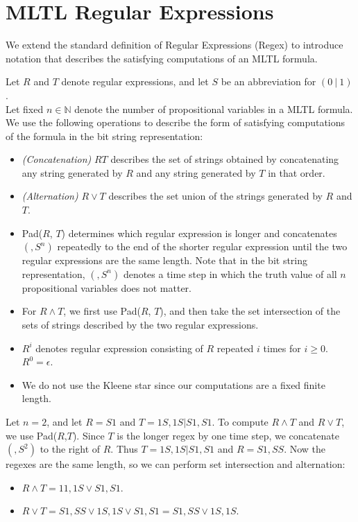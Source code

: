 \documentclass[runningheads]{llncs}
\begin{document}
\section{MLTL Regular Expressions} \label{regex}
\vspace{-0.1in}
We extend the standard definition of Regular Expressions (Regex) \cite{sipser} to introduce notation that describes the satisfying computations of an MLTL formula.
\begin{definition} \label{TRE} 
Let $R$ and $T$ denote regular expressions, and let $S$ be an abbreviation for $(0 \ | \ 1)$.\\
Let fixed $n \in \mathbb{N}$ denote the number of propositional variables in a MLTL formula. We use the following operations to describe the form of satisfying computations of the formula in the bit string representation:
\begin{itemize}
  \item \emph{(Concatenation)} $RT$ describes the set of strings obtained by concatenating any string generated by $R$ and any string generated by $T$ in that order.
 \item \emph{(Alternation)} $R \lor T$ describes the set union of the strings generated by $R$ and $T$.
\item Pad($R$, $T$) determines which regular expression is longer and concatenates $(,S^n)$ repeatedly to the end of the shorter regular expression until the two regular expressions are the same length. Note that in the bit string representation, $(,S^n)$ denotes a time step in which the truth value of all $n$ propositional variables does not matter.
\item For $R \land T$, we first use Pad($R$, $T$), and then take the set intersection of the sets of strings described by the two regular expressions.
\item $R^i$ denotes regular expression consisting of $R$ repeated $i$ times for $i \geq 0$. $R^0 = \epsilon$. %
\item We do not use the Kleene star since our computations are a fixed finite length.
\end{itemize}
\end{definition}
\begin{example} %
Let $n = 2$, and let $R = S1$ and $T = 1S,1S | S1,S1$.
To compute $R \land T$ and $R \lor T$, we use Pad($R$,$T$). Since $T$ is the longer regex by one time step, we concatenate $(,S^2)$ to the right of $R$. Thus $T =1S,1S | S1,S1$ and $R = S1,SS$. Now the regexes are the same length, so we can perform set intersection and alternation:
\begin{itemize}
    \item $R \land T = 11,1S \lor S1, S1$.
    \item $R \lor T = S1,SS \lor 1S,1S \lor S1,S1 = S1,SS \lor 1S,1S$.
\end{itemize}
\end{example}
\end{document}
